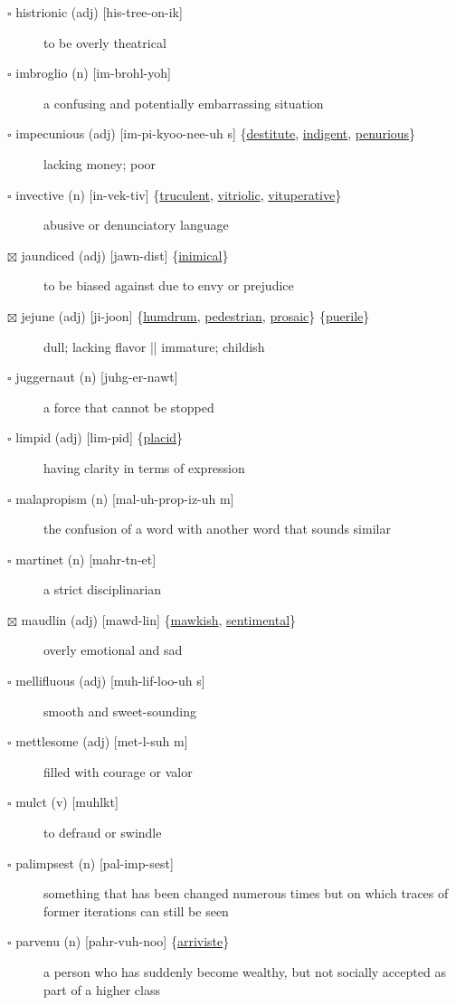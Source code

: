 \documentclass[11pt]{article}
\begin{document}
\begin{description}
\item[{$\square$ histrionic (adj) [his-tree-on-ik]}] to be overly theatrical
\item[{$\square$ imbroglio (n) [im-brohl-yoh]}] a confusing and potentially embarrassing situation
\item[{$\square$ \label{org6910be9}impecunious (adj) [im-pi-kyoo-nee-uh s] \{\hyperref[orgecdf9e1]{destitute}, \hyperref[org975d945]{indigent}, \hyperref[orgb268dd4]{penurious}\}}] lacking money; poor
\item[{$\square$ \label{org56976d1}invective (n) [in-vek-tiv] \{\hyperref[orgb5ddc36]{truculent}, \hyperref[orga346b37]{vitriolic}, \hyperref[org5485467]{vituperative}\}}] abusive or denunciatory language
\item[{$\boxtimes$ \label{orgfb883d9} \label{org4928894}jaundiced (adj) [jawn-dist] \{\hyperref[org91295a0]{inimical}\}}] to be biased against due to envy or prejudice
\item[{$\boxtimes$ \label{org2d80182}jejune (adj) [ji-joon] \{\hyperref[org896fd35]{humdrum}, \hyperref[org78dd6a1]{pedestrian}, \hyperref[orgb8ddd33]{prosaic}\} \{\hyperref[org45ddcde]{puerile}\}}] dull; lacking flavor || immature; childish
\item[{$\square$ juggernaut (n) [juhg-er-nawt]}] a force that cannot be stopped
\item[{$\square$ \label{org0ca8cae}limpid (adj) [lim-pid] \{\hyperref[org862d885]{placid}\}}] having clarity in terms of expression
\item[{$\square$ malapropism (n) [mal-uh-prop-iz-uh m]}] the confusion of a word with another word that sounds similar
\item[{$\square$ martinet (n) [mahr-tn-et]}] a strict disciplinarian
\item[{$\boxtimes$ \label{org4160f55}maudlin (adj) [mawd-lin] \{\hyperref[org0099c38]{mawkish}, \hyperref[org452b84f]{sentimental}\}}] overly emotional and sad
\item[{$\square$ mellifluous (adj) [muh-lif-loo-uh s]}] smooth and sweet-sounding
\item[{$\square$ mettlesome (adj) [met-l-suh m]}] filled with courage or valor
\item[{$\square$ mulct (v) [muhlkt]}] to defraud or swindle
\item[{$\square$ palimpsest (n) [pal-imp-sest]}] something that has been changed numerous times but on which traces of former iterations can still be seen
\item[{$\square$ \label{org313bbe0}parvenu (n) [pahr-vuh-noo] \{\hyperref[org8cd8fa4]{arriviste}\}}] a person who has suddenly become wealthy, but not socially accepted as part of a higher class

\end{description}
\end{document}
